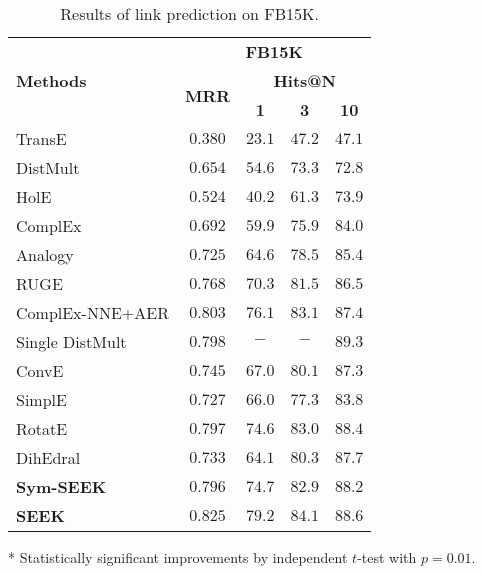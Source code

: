 \documentclass[11pt,a4paper]{article}
\newcommand{\Outperform}[1]{\mathbf{#1}}
\newcommand{\TableSize}{\footnotesize} \renewcommand{\thefootnote}{\fnsymbol{footnote}}
\begin{document}
\begin{table}[!h]
	\centering
	\begin{threeparttable}
		
		\TableSize
		\begin{tabular}{ l | c  c  c  c}
			\toprule
			\multirow{3}{*}{\textbf{Methods }}  &  \multicolumn{4}{c}{\textbf{FB15K}} \\
			\cmidrule{2-5}	
			& \multirow{2}{*}{\textbf{MRR}}  &  \multicolumn{3}{c}{\textbf{Hits@N}} \\ 
			\cmidrule{3-5}	
			& & \textbf{1} & \textbf{3} & \textbf{10}  \\ 
			\midrule
			TransE& $0.380$ & $23.1$ & $47.2$ & $47.1$ \\
			DistMult& $0.654$ & $54.6$ & $73.3$ & $72.8$ \\
			HolE & $0.524$ & $40.2$ & $61.3$ & $73.9$ \\
			ComplEx& $0.692$ & $59.9$ & $75.9$ & $84.0$ \\		
			Analogy& $0.725$ & $64.6$ & $78.5$ & $85.4$ \\
			\midrule
			RUGE& $0.768$ & $70.3$ & $81.5$ & $86.5$ \\
			ComplEx-NNE+AER & $0.803$ & $76.1$ & $83.1$ & $87.4$\\
			\midrule
			Single DistMult & $0.798$ &$-$ &$-$&$\Outperform{89.3}$ \\	
			ConvE& $0.745$ & $67.0$ & $80.1$ & $87.3$ \\
SimplE& $0.727$ & $66.0$ & $77.3$ & $83.8$  \\
RotatE& $0.797$ & $74.6$ & $83.0$ & $88.4$ \\ 
			DihEdral & $0.733$ & $64.1$ & $80.3$ & $87.7$ \\
			\midrule
			\textbf{Sym-SEEK}\tnote{*} & $0.796$ &  $74.7$ & $82.9$ & $88.2$ \\
			\textbf{SEEK}\tnote{*} & $\Outperform{0.825}$ &  $\Outperform{79.2}$ & $\Outperform{84.1}$ & $88.6$ \\
			\bottomrule
		\end{tabular}
		
		\begin{tablenotes}
			\item[*] Statistically significant improvements by independent $t$-test with $p = 0.01$.
		\end{tablenotes}
		
	\end{threeparttable}
	\caption{Results of link prediction on FB15K.}	
	\label{tab:kbc-performance-fb15k}
\end{table}
\end{document}
